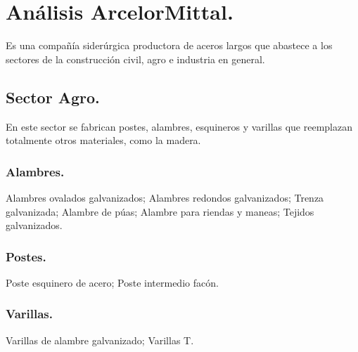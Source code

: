 \documentclass[12pt,a4paper]{article}
\begin{document}
\section{Análisis ArcelorMittal.}
Es una compañía siderúrgica productora de aceros largos que abastece a los sectores de la construcción civil, agro e industria en general.

\subsection{Sector Agro.}
En este sector se fabrican postes, alambres, esquineros y varillas que reemplazan totalmente otros materiales, como la madera.

\subsubsection*{Alambres.}
Alambres ovalados galvanizados; Alambres redondos galvanizados; Trenza galvanizada; Alambre de púas; Alambre para riendas y maneas; Tejidos galvanizados.

\subsubsection*{Postes.}
Poste esquinero de acero; Poste intermedio facón.

\subsubsection*{Varillas.}
Varillas de alambre galvanizado; Varillas T.
\end{document}
